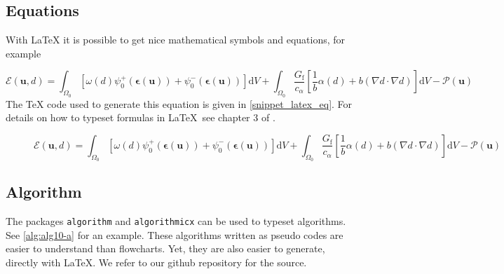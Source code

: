 \documentclass[authoryear,12pta4paper,fleqn]{article}
\newcommand{\bfepsilon}{\boldsymbol{\epsilon}}
\newcommand{\bfu}{\boldsymbol{u}}
\newcommand{\td}{\text{d}}
\newcommand{\latex}{\LaTeX\xspace}
\numberwithin{equation}{section}
\theoremstyle{remark}
\begin{document}
\subsection{Equations}\label{sec:equation-latex}


With \latex it is possible to get nice mathematical symbols and equations, for example

\begin{equation}
  \mathscr{E} (\bfu, d) 
    = \int_{\varOmega_{0}} \left[\omega(d)\psi_{0}^+(\bfepsilon (\bfu)) + \psi_{0}^-(\bfepsilon (\bfu)) \right]\td V
    + \int_{\varOmega_{0}}  \frac{G_\text{f}}{c_\alpha} \left[ \frac{1}{b} \alpha(d)
    + b \left( \nabla d \cdot \nabla d \right) \right] \td V
    - \mathscr{P} (\bfu)   
\label{eq:3}
\end{equation}
The TeX code used to generate this equation is given in \cref{snippet_latex_eq}. For details on how to typeset formulas in \LaTeX\, see chapter 3 of \cite{latex}.

\begin{figure}[!h]
  \begin{snippetlatex}[caption={\LaTeX\ commands to generate \cref{eq:3}. Each equation should have a unique label.},label={snippet_latex_eq},framerule=1pt,tabsize=3]
    \begin{equation}
      \mathscr{E} (\bfu, d) 
        = \int_{\varOmega_{0}} \left[\omega(d)\psi_{0}^+(\bfepsilon (\bfu)) + 
        \psi_{0}^-(\bfepsilon (\bfu)) \right]\td V + 
        \int_{\varOmega_{0}}  \frac{G_\text{f}}{c_\alpha} \left[ \frac{1}{b} \alpha(d)
        + b \left( \nabla d \cdot \nabla d \right) \right] \td V
        - \mathscr{P} (\bfu)   
    \label{eq:3}    %
    \end{equation}
  \end{snippetlatex}
\end{figure}





\subsection{Algorithm}\label{sec:algorithm}

The packages \texttt{algorithm} and \texttt{algorithmicx} can be used to typeset algorithms. See  \cref{alg:alg10-a} for an example. These algorithms written as pseudo codes are easier to understand than flowcharts. Yet, they are also easier to generate, directly with \LaTeX. We refer to our github repository for the source.\\
\end{document}
